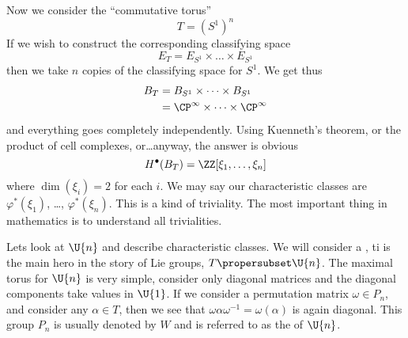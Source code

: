 Now we consider the ``commutative torus''
\begin{equation}
T=(S^{1})^{n}
\end{equation}
If we wish to construct the corresponding classifying space
\begin{equation}
E_{T}=E_{S^{1}}\times\dots\times E_{S^{1}}
\end{equation}
then we take $n$ copies of the classifying space for $S^{1}$. We
get thus 
\begin{equation}
\begin{split}
B_{T}&=B_{S^{1}}\times\dots\times B_{S^{1}}\\
&=\CP^{\infty}\times\dots\times\CP^{\infty}
\end{split}
\end{equation}
and everything goes completely independently. Using Kuenneth's
theorem, or the product of cell complexes, or\dots anyway, the
answer is obvious
\begin{equation}
H^{\bullet}(B_{T})=\ZZ[\xi_{1},\dots,\xi_{n}]
\end{equation}
where
$\dim(\xi_{i})=2$ for each $i$. We may say our characteristic
classes are $\varphi^{*}(\xi_{1})$, \dots,
$\varphi^{*}(\xi_{n})$. This is a kind of triviality. The most
important thing in mathematics is to understand all trivialities.

\label{defn:maximalTorus}
Lets look at $\U{n}$ and describe characteristic classes.
We will consider a , ti is the main hero in
the story of Lie groups, $T\propersubset\U{n}$. The maximal torus
for $\U{n}$ is very simple, consider only diagonal matrices and
the diagonal components take values in $\U{1}$. If we consider a
permutation matrix $\omega\in P_{n}$, and consider any $\alpha\in
T$, then we see that $\omega\alpha\omega^{-1}=\omega(\alpha)$ is
again diagonal. This group $P_{n}$ is usually denoted by $W$ and
is referred to as the  of $\U{n}$.

